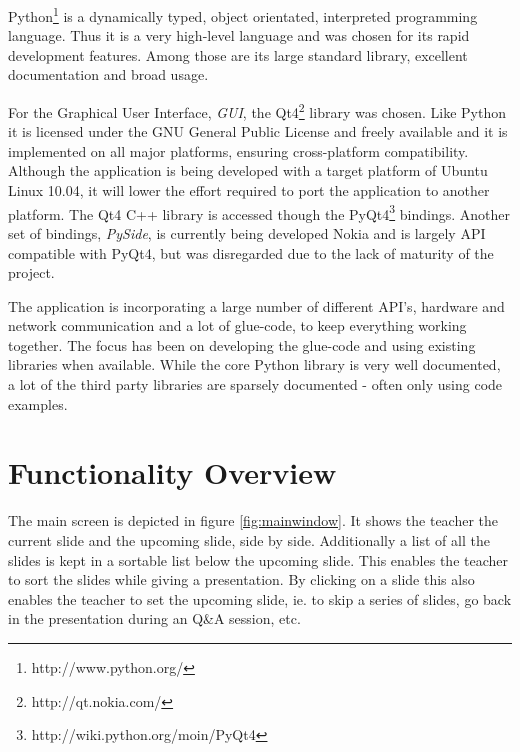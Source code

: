 \documentclass[a4paper,12pt]{article}
\begin{document}
Python\footnote{http://www.python.org/} is a dynamically typed, object orientated, interpreted programming language. Thus it is a very high-level language and was chosen for its rapid development features. Among those are its large standard library, excellent documentation and broad usage. 

For the Graphical User Interface, \emph{GUI}, the Qt4\footnote{http://qt.nokia.com/} library was chosen. Like Python it is licensed under the GNU General Public License and freely available and it is implemented on all major platforms, ensuring cross-platform compatibility. Although the application is being developed with a target platform of Ubuntu Linux 10.04, it will lower the effort required to port the application to another platform. The Qt4 C++ library is accessed though the PyQt4\footnote{http://wiki.python.org/moin/PyQt4} bindings. Another set of bindings, \emph{PySide}, is currently being developed Nokia and is largely API compatible with PyQt4, but was disregarded due to the lack of maturity of the project.

The application is incorporating a large number of different API's, hardware and network communication and a lot of glue-code, to keep everything working together. The focus has been on developing the glue-code and using existing libraries when available. While the core Python library is very well documented, a lot of the third party libraries are sparsely documented - often only using code examples.
 
\section{Functionality Overview}

The main screen is depicted in figure \ref{fig:mainwindow}. It shows the teacher the current slide and the upcoming slide, side by side. Additionally a list of all the slides is kept in a sortable list below the upcoming slide. This enables the teacher to sort the slides while giving a presentation. By clicking on a slide this also enables the teacher to set the upcoming slide, ie. to skip a series of slides, go back in the presentation during an Q\&A session, etc. 
\end{document}
